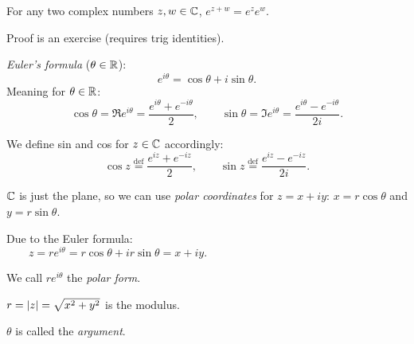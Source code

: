\documentclass[10pt,aspectratio=169]{beamer}
\begin{document}
\begin{frame}
\begin{proposition}
For any two complex numbers $z,w \in {\mathbb{C}}$,
$
e^{z+w} = e^z e^w .
$
\end{proposition}

Proof is an exercise (requires trig identities).


\pause
\medskip

\emph{Euler's formula} ($\theta \in {\mathbb{R}}$):
\begin{equation*}
e^{i\theta}
=
\cos \theta + i \sin \theta .
\end{equation*}
\pause
Meaning for $\theta \in {\mathbb{R}}$:
\begin{equation*}
\cos \theta = \Re e^{i\theta} = \frac{e^{i\theta}+e^{-i\theta}}{2} ,
\qquad
\sin \theta = \Im e^{i\theta} = \frac{e^{i\theta}-e^{-i\theta}}{2i} .
\end{equation*}

\pause
We define sin and cos for $z \in {\mathbb{C}}$ accordingly:
\begin{equation*}
\cos z \overset{\text{def}}{=} \frac{e^{iz}+e^{-iz}}{2} ,
\qquad
\sin z \overset{\text{def}}{=} \frac{e^{iz}-e^{-iz}}{2i} .
\end{equation*}

\end{frame}

\begin{frame}
${\mathbb{C}}$ is just the plane, so we can use \emph{polar coordinates} for $z=x+iy$:
$x = r \cos \theta$ and $y= r \sin \theta$.

\medskip
\pause
Due to the Euler formula:
\begin{equation*}
z = r e^{i\theta} = r\cos \theta + i r\sin \theta  = x+iy .
\qquad \qquad \qquad \qquad \qquad \qquad \qquad \qquad
\end{equation*}

\vspace*{-0.5in}
\hspace*{3.5in}{polarcoords.pdf_t}

\vspace*{-0.4in}

\pause

We call $re^{i \theta}$ the \emph{polar form}.

\pause
\medskip


$r = \lvert {z} \rvert = \sqrt{x^2+y^2}$ is the modulus.

\pause
\medskip

$\theta$ is called the \emph{argument}.

\end{frame}
\end{document}
